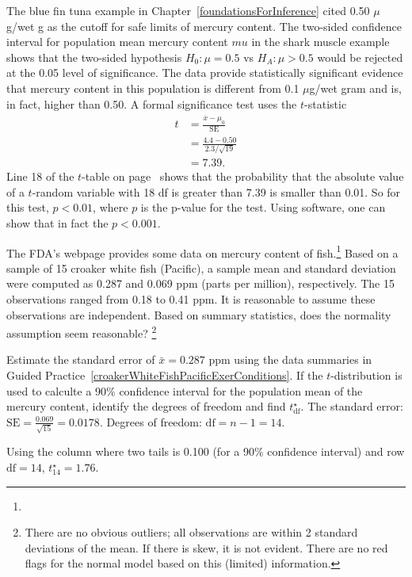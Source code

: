 The blue fin tuna example in Chapter~\ref{foundationsForInference} cited 0.50 $\mu$g/wet g as the cutoff for safe limits of mercury content.  The two-sided confidence interval for population mean mercury content $
mu$ in the shark muscle example shows that the two-sided hypothesis $H_0: \mu = 0.5$ vs $H_A: \mu > 0.5$ would be rejected at the 0.05 level of significance.  The data provide statistically significant evidence that mercury content in this population is different from 0.1 $\mu$g/wet gram and is, in fact, higher than 0.50.  A formal significance test uses the $t$-statistic
\begin{align*}
	t &= \frac{\overline{x} - \mu_0}{\text{SE}} \\
	  &= \frac{4.4 - 0.50}{2.3/\sqrt{19}} \\
	  &= 7.39.
\end{align*}
Line 18 of the $t$-table on page~\pageref{tTableSample} shows that the probability that the absolute value of a $t$-random variable with 18 df is greater than 7.39 is smaller than 0.01. So for this test, $p < 0.01$, where $p$ is the p-value for the test. Using software, one can show that in fact the $p < 0.001$.

\begin{exercise} \label{croakerWhiteFishPacificExerConditions}
The FDA's webpage provides some data on mercury content of fish.\footnote{} Based on a sample of 15 croaker white fish (Pacific), a sample mean and standard deviation were computed as 0.287 and 0.069 ppm (parts per million), respectively. The 15 observations ranged from 0.18 to 0.41 ppm. It is reasonable to assume these observations are independent. Based on summary statistics, does the normality assumption seem reasonable? \footnote{There are no obvious outliers; all observations are within 2 standard deviations of the mean. If there is skew, it is not evident. There are no red flags for the normal model based on this (limited) information.}
\end{exercise}

\begin{example}{Estimate the standard error of $\bar{x}=0.287$ ppm using the data summaries in Guided Practice~\ref{croakerWhiteFishPacificExerConditions}. If the $t$-distribution is used to calculte a 90\% confidence interval for the population mean of the mercury content, identify the degrees of freedom and find $t^{\star}_{\text{df}}$.}
\label{croakerWhiteFishPacificExerSEDFTStar}
The standard error: $\text{SE} = \frac{0.069}{\sqrt{15}} = 0.0178$. Degrees of freedom: $\text{df} = n - 1 = 14$.

Using the column where two tails is 0.100 (for a 90\% confidence interval) and row $\text{df}=14$,  $t^{\star}_{14} = 1.76$.
\end{example}


